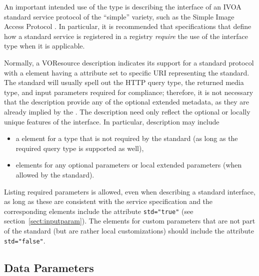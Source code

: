 \documentclass[11pt,a4paper]{ivoa}
\begin{document}






An important intended use of the  type is
describing the interface of an IVOA standard service protocol
of the ``simple'' variety, such as the Simple Image Access Protocol
\citep{2015ivoa.spec.1223D}.  In particular, it is recommended that
specifications that define how a standard service is registered in a
registry \emph{require} the use of the 
interface type when it is applicable.



Normally, a VOResource
description indicates its support for a standard protocol with a
 element having a
 attribute set to specific URI representing the
standard.  The standard will usually spell out the HTTP query type,
the returned media type, and input parameters required for compliance;
therefore, it is not necessary that the 
description provide any of the optional extended metadata, as they are
already implied by the .  The description need
only reflect the optional or locally unique features of the
interface.  In particular, description may include


\begin{itemize}
\item a  element for a type that is not
  required by the standard (as long as the required query type is
  supported as well),

\item {}\/ elements for any optional parameters
       or local extended parameters (when allowed by the standard).
\end{itemize}


Listing required parameters is allowed, even when
describing a standard interface, as long as these are consistent with
the service specification and the corresponding 
elements include the attribute \verb|std="true"| (see
section~\ref{sect:inputparam}).  The 
elements for custom parameters that are not part of the standard (but
are rather local customizations) should include the attribute
\verb|std="false"|.





\subsection{Data Parameters}
\label{sect:param}
\end{document}
